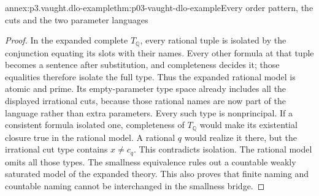 \begin{annexitem}{annex:p3.vaught.dlo-example}{thm:p03-vaught-dlo-example}{Every order pattern, the cuts and the two parameter languages}
\begin{proof}
In the expanded complete \(T_{\mathbb Q}\), every rational tuple
is isolated by the conjunction equating its slots with their names.
Every other formula at that tuple becomes a sentence after
substitution, and completeness decides it; those equalities
therefore isolate the full type. Thus the expanded rational model
is atomic and prime.
Its empty-parameter type space already includes all the displayed
irrational cuts, because those rational names are now part of the
language rather than extra parameters.
Every such type is nonprincipal. If a consistent formula isolated
one, completeness of \(T_{\mathbb Q}\) would make its existential
closure true in the rational model. A rational \(q\) would realize
it there, but the irrational cut type contains \(x\ne c_q\).
This contradicts isolation. The rational model omits all those types.
The smallness equivalence rules out a countable weakly saturated
model of the expanded theory. This also proves that finite naming
and countable naming cannot be interchanged in the smallness bridge.
\end{proof}
\end{annexitem}

